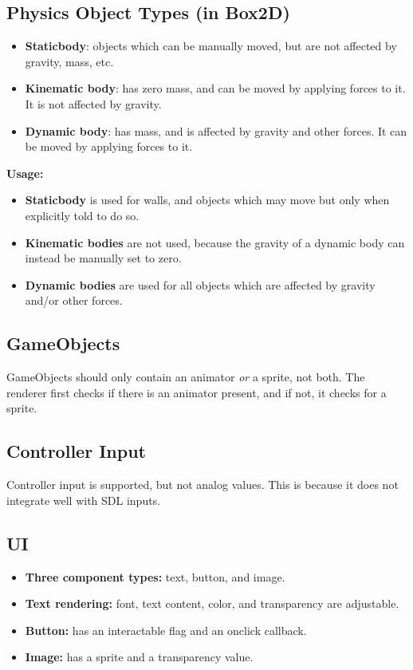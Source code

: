 \documentclass{article}
\begin{document}
\subsection{Physics Object Types (in Box2D)}
\begin{itemize}
  \item \textbf{Staticbody}: objects which can be manually moved, but are not affected by gravity, mass, etc.
  \item \textbf{Kinematic body}: has zero mass, and can be moved by applying forces to it. It is not affected by gravity.
  \item \textbf{Dynamic body}: has mass, and is affected by gravity and other forces. It can be moved by applying forces to it.
\end{itemize}

\noindent
\textbf{Usage:}
\begin{itemize}
  \item \textbf{Staticbody} is used for walls, and objects which may move but only when explicitly told to do so.
  \item \textbf{Kinematic bodies} are not used, because the gravity of a dynamic body can instead be manually set to zero.
  \item \textbf{Dynamic bodies} are used for all objects which are affected by gravity and/or other forces.
\end{itemize}

\subsection{GameObjects}
GameObjects should only contain an animator \textit{or} a sprite, not both. The renderer first checks if there is an animator present, and if not, it checks for a sprite.

\subsection{Controller Input}
Controller input is supported, but not analog values. This is because it does not integrate well with SDL inputs.

\subsection{UI}
\begin{itemize}
  \item \textbf{Three component types:} text, button, and image.
  \item \textbf{Text rendering:} font, text content, color, and transparency are adjustable.
  \item \textbf{Button:} has an interactable flag and an onclick callback.
  \item \textbf{Image:} has a sprite and a transparency value.
\end{itemize}
\end{document}
